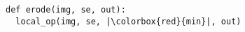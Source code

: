 \documentclass[varwidth=4cm, border={0.1cm 0.1cm 0.1cm 0.1cm}]{standalone}
\begin{document}
\begin{verbatim}
def erode(img, se, out):
  local_op(img, se, |\colorbox{red}{min}|, out)
\end{verbatim}
\end{document}
